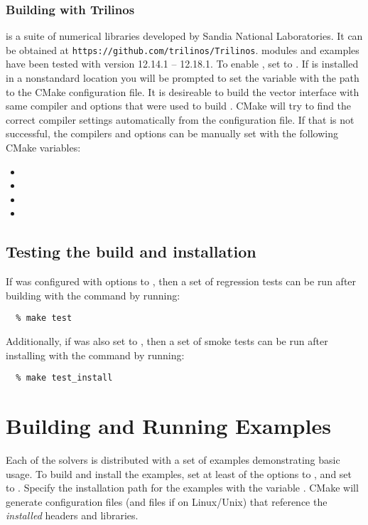 \subsubsection*{Building with Trilinos}
{\trilinos} is a suite of numerical libraries developed by Sandia National
Laboratories. It can be obtained at {\tt https://github.com/trilinos/Trilinos}.
{\sundials} {\trilinos} modules and examples have been tested with {\trilinos}
version 12.14.1 -- 12.18.1. To enable {\trilinos}, set
 to . If {\trilinos} is
installed in a nonstandard location you will be prompted to set the
variable  with the path to the {\trilinos} CMake
configuration file. It is desireable to build the {\trilinos} vector interface
with same compiler and options that were used to build {\trilinos}.
CMake will try to find the correct compiler settings automatically from the
{\trilinos} configuration file. If that is not successful,
the compilers and options can be manually set with the following CMake variables:
\begin{itemize}
\item
{}
\item
{}
\item
{}
\item
{}
\end{itemize}

\subsection{Testing the build and installation}

If {\sundials} was configured with
 options to , then a set of
regression tests can be run after building with the  command
by running:
\begin{verbatim}
  % make test
\end{verbatim}
Additionally, if  was also set to , then
a set of smoke tests can be run after installing with the 
command by running:
\begin{verbatim}
  % make test_install
\end{verbatim}

\section{Building and Running Examples}
Each of the {\sundials} solvers is distributed with a set of examples
demonstrating basic usage. To build and install the examples, set at least of
the  options to , and set
 to .  Specify the installation path for the
examples with the variable . CMake will generate
 configuration files (and  files if on
Linux/Unix) that reference the {\em installed} {\sundials} headers and
libraries.

